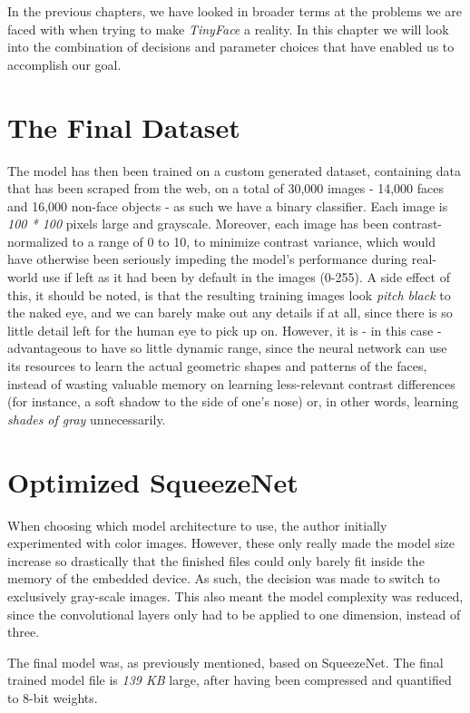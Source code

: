 In the previous chapters, we have looked in broader terms at the problems we are faced with when trying to make \textit{TinyFace} a reality. In this chapter we will look into the combination of decisions and parameter choices that have enabled us to accomplish our goal.

\section{The Final Dataset}
The model has then been trained on a custom generated dataset, containing data that has been scraped from the web, on a total of 30,000 images - 14,000 faces and 16,000 non-face objects - as such we have a binary classifier. Each image is \textit{100 * 100} pixels large and grayscale. Moreover, each image has been contrast-normalized to a range of 0 to 10, to minimize contrast variance, which would have otherwise been seriously impeding the model's performance during real-world use if left as it had been by default in the images (0-255). A side effect of this, it should be noted, is that the resulting training images look \textit{pitch black} to the naked eye, and we can barely make out any details if at all, since there is so little detail left for the human eye to pick up on. However, it is - in this case - advantageous to have so little dynamic range, since the neural network can use its resources to learn the actual geometric shapes and patterns of the faces, instead of wasting valuable memory on learning less-relevant contrast differences (for instance, a soft shadow to the side of one's nose) or, in other words, learning \textit{shades of gray} unnecessarily. \par

\section{Optimized SqueezeNet}
When choosing which model architecture to use, the author initially experimented with color images. However, these only really made the model size increase so drastically that the finished files could only barely fit inside the memory of the embedded device. As such, the decision was made to switch to exclusively gray-scale images. This also meant the model complexity was reduced, since the convolutional layers only had to be applied to one dimension, instead of three. \par
The final model was, as previously mentioned, based on SqueezeNet. The final trained model file is \textit{139 KB} large, after having been compressed and quantified to 8-bit weights. \par

